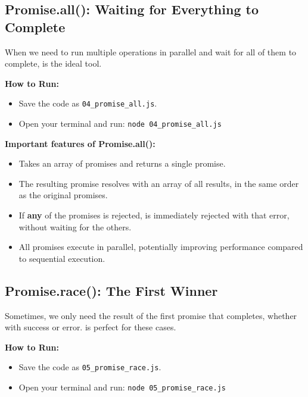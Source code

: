 \subsection{Promise.all(): Waiting for Everything to Complete}

When we need to run multiple operations in parallel and wait for all of them to complete,  is the ideal tool.

\textbf{How to Run:}
\begin{itemize}
    \item Save the code as \verb|04_promise_all.js|.
    \item Open your terminal and run: \verb|node 04_promise_all.js|
\end{itemize}

\begin{macterminal}
  
\end{macterminal}

\textbf{Important features of Promise.all():}
\begin{itemize}
    \item Takes an array of promises and returns a single promise.
    \item The resulting promise resolves with an array of all results, in the same order as the original promises.
    \item If \textbf{any} of the promises is rejected,  is immediately rejected with that error, without waiting for the others.
    \item All promises execute in parallel, potentially improving performance compared to sequential execution.
\end{itemize}

\subsection{Promise.race(): The First Winner}

Sometimes, we only need the result of the first promise that completes, whether with success or error.  is perfect for these cases.

\textbf{How to Run:}
\begin{itemize}
    \item Save the code as \verb|05_promise_race.js|.
    \item Open your terminal and run: \verb|node 05_promise_race.js|
\end{itemize}

